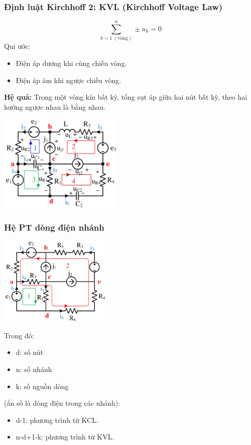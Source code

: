 \subsubsection{Định luật Kirchhoff 2: KVL (Kirchhoff Voltage Law)} 
\begin{equation}
  \sum_{k=1 \ (\text{vòng})}^{n} \pm u_k = 0
\end{equation}
Qui ước:
\begin{itemize}
  \item Điện áp dương khi cùng chiều vòng.
  \item Điện áp âm khi ngược chiều vòng.
\end{itemize}
\textbf{Hệ quả:} Trong một vòng kín bất kỳ, tổng sụt áp giữa hai nút bất kỳ, theo hai hướng ngược nhau là bằng nhau.
\begin{center}
  \includegraphics[width = 0.45\textwidth]{./image/17.png}
\end{center}
\subsubsection{Hệ PT dòng điện nhánh}
\begin{center}
  \includegraphics[width = 0.4\textwidth]{./image/18.png} 
\end{center}
Trong đó:\begin{itemize}
  \item d: số nút
  \item n: số nhánh
  \item k: số nguồn dòng
\end{itemize}
(ẩn số là dòng điện trong các nhánh):
\begin{itemize}
  \item d-1: phương trình từ KCL.
  \item n-d+1-k: phương trình từ KVL.
\end{itemize}
